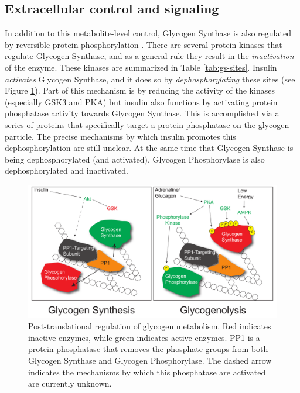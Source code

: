\documentclass{tufte-handout}
\begin{document}
\subsection{Extracellular control and signaling}

In addition to this metabolite-level control, Glycogen Synthase is also regulated by reversible protein phosphorylation \citep{Larner1960}.  There are several protein kinases that regulate Glycogen Synthase, and as a general rule they result in the \emph{inactivation} of the enzyme.  These kinases are summarized in Table \ref{tab:gs-sites}.  Insulin \emph{activates} Glycogen Synthase, and it does so by \emph{dephosphorylating} these sites (see Figure \ref{fig:glycogen-phosphorylation}).  Part of this mechanism is by reducing the activity of the kinases (especially GSK3 and PKA) but insulin also functions by activating protein phosphatase activity towards Glycogen Synthase.  This is accomplished via a series of proteins that specifically target a protein phosphatase on the glycogen particle.  The precise mechanisms by which insulin promotes this dephosphorylation are still unclear.  At the same time that Glycogen Synthase is being dephosphorylated (and activated), Glycogen Phosphorylase is also dephosphorylated and inactivated.

\begin{figure}
\includegraphics{figures/glycogen-phosphorylation}
\caption{Post-translational regulation of glycogen metabolism.  Red indicates inactive enzymes, while green indicates active enzymes. PP1 is a protein phosphatase that removes the phosphate groups from both Glycogen Synthase and Glycogen Phosphorylase.  The dashed arrow indicates the mechanisms by which this phosphatase are activated are currently unknown.}
\label{fig:glycogen-phosphorylation}
\end{figure}
\end{document}
